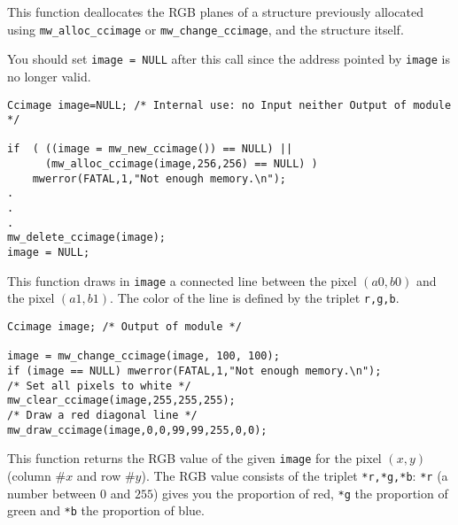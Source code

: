 \newpage %

\Description
This function deallocates the RGB planes of a \ccimage structure previously
allocated using \verb+mw_alloc_ccimage+ or \verb+mw_change_ccimage+, and the
structure itself. 

You should set \verb+image = NULL+ after this call since the address pointed
by \verb+image+ is no longer valid.

\Next
\Example
\begin{verbatim}
Ccimage image=NULL; /* Internal use: no Input neither Output of module */

if  ( ((image = mw_new_ccimage()) == NULL) ||
      (mw_alloc_ccimage(image,256,256) == NULL) )
    mwerror(FATAL,1,"Not enough memory.\n");
.
.
.
mw_delete_ccimage(image);
image = NULL;

\end{verbatim}

\newpage %
\Description
This function draws in \verb+image+ a connected line between the pixel $(a0,b0)$ and the pixel $(a1,b1)$. The color of the line is defined by the triplet \verb+r,g,b+.

\Next
\Example
\begin{verbatim}
Ccimage image; /* Output of module */

image = mw_change_ccimage(image, 100, 100);
if (image == NULL) mwerror(FATAL,1,"Not enough memory.\n");
/* Set all pixels to white */
mw_clear_ccimage(image,255,255,255);
/* Draw a red diagonal line */
mw_draw_ccimage(image,0,0,99,99,255,0,0);
\end{verbatim}

\newpage %
\Description
This function returns the RGB value of the given \verb+image+ for the pixel $(x,y)$ (column $\# x$ and row $\# y$).
The RGB value consists of the triplet \verb+*r,*g,*b+: \verb+*r+ (a number between $0$ and $255$) gives you the proportion of red, \verb+*g+ the proportion of green and \verb+*b+ the proportion of blue.

